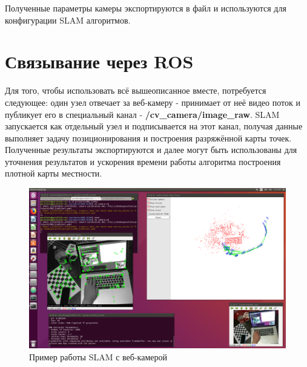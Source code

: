 Полученные параметры камеры экспортируются в файл и используются для конфигурации SLAM алгоритмов.

\section{Связывание через ROS}

Для того, чтобы использовать всё вышеописанное вместе, потребуется следующее: один узел отвечает за веб-камеру - принимает от неё видео поток и публикует его в специальный канал - \textbf{/cv\_camera/image\_raw}. SLAM запускается как отдельный узел и подписывается на этот канал, получая данные выполняет задачу позиционирования и построения разряжённой карты точек. Полученные результаты экспортируются и далее могут быть использованы для уточнения результатов и ускорения времени работы алгоритма построения плотной карты местности.

\begin{figure}[h]
    \centering
    \includegraphics[width=1.0\textwidth]{images/ros-slam.png}
    \caption{Пример работы SLAM с веб-камерой}
    \label{fig:ros-slam}
\end{figure}